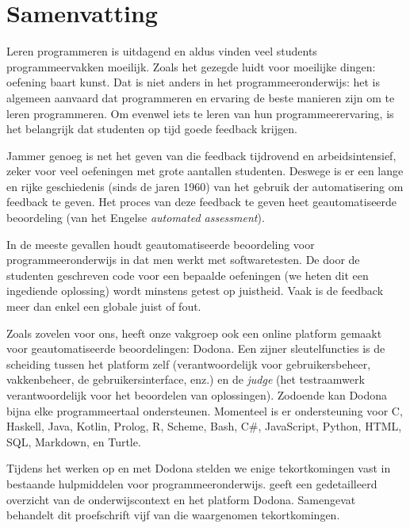 \documentclass[main]{subfiles}
\begin{document}

\chapter*{Samenvatting}\label{ch:samenvatting}

Leren programmeren is uitdagend en aldus vinden veel students programmeervakken moeilijk.
Zoals het gezegde luidt voor moeilijke dingen: oefening baart kunst.
Dat is niet anders in het programmeeronderwijs: het is algemeen aanvaard dat programmeren en ervaring de beste manieren zijn om te leren programmeren.
Om evenwel iets te leren van hun programmeerervaring, is het belangrijk dat studenten op tijd goede feedback krijgen.

Jammer genoeg is net het geven van die feedback tijdrovend en arbeidsintensief, zeker voor veel oefeningen met grote aantallen studenten.
Deswege is er een lange en rijke geschiedenis (sinds de jaren 1960) van het gebruik der automatisering om feedback te geven.
Het proces van deze feedback te geven heet geautomatiseerde beoordeling (van het Engelse \textit{\textenglish{automated assessment}}).

In de meeste gevallen houdt geautomatiseerde beoordeling voor programmeeronderwijs in dat men werkt met softwaretesten.
De door de studenten geschreven code voor een bepaalde oefeningen (we heten dit een ingediende oplossing) wordt minstens getest op juistheid.
Vaak is de feedback meer dan enkel een globale juist of fout.

Zoals zovelen voor ons, heeft onze vakgroep ook een online platform gemaakt voor geautomatiseerde beoordelingen: Dodona.
Een zijner sleutelfuncties is de scheiding tussen het platform zelf (verantwoordelijk voor gebruikersbeheer, vakkenbeheer, de gebruikersinterface, enz.) en de \textit{judge} (het testraamwerk verantwoordelijk voor het beoordelen van oplossingen).
Zodoende kan Dodona bijna elke programmeertaal ondersteunen.
Momenteel is er ondersteuning voor C, Haskell, Java, Kotlin, Prolog, R, Scheme, Bash, C\#, JavaScript, Python, HTML, SQL, Markdown, en Turtle.

Tijdens het werken op en met Dodona stelden we enige tekortkomingen vast in bestaande hulpmiddelen voor programmeeronderwijs.
 geeft een gedetailleerd overzicht van de onderwijscontext en het platform Dodona.
Samengevat behandelt dit proefschrift vijf van die waargenomen tekortkomingen.
\end{document}
